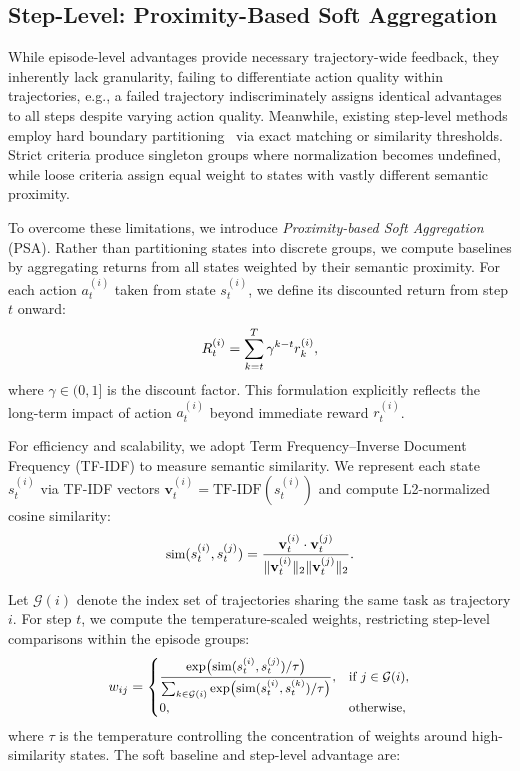 \documentclass[11pt]{article}
\begin{document}
\subsection{Step-Level: Proximity-Based Soft Aggregation}
\label{sec:step_level}

While episode-level advantages provide necessary trajectory-wide feedback, they inherently lack granularity, failing to differentiate action quality within trajectories, e.g., a failed trajectory indiscriminately assigns identical advantages to all steps despite varying action quality. Meanwhile, existing step-level methods employ hard boundary partitioning~\cite{feng2025group} via exact matching or similarity thresholds. Strict criteria produce singleton groups where normalization becomes undefined, while loose criteria assign equal weight to states with vastly different semantic proximity.

To overcome these limitations, we introduce \textit{Proximity-based Soft Aggregation} (PSA). Rather than partitioning states into discrete groups, we compute baselines by aggregating returns from all states weighted by their semantic proximity. For each action $a_t^{(i)}$ taken from state $s_t^{(i)}$, we define its discounted return from step $t$ onward:
\begin{equation}
\small
\label{eq:discounted_return}
R_t^{(i)} = \sum_{k=t}^T \gamma^{k-t} r_k^{(i)},
\end{equation}
where $\gamma \in (0, 1]$ is the discount factor. This formulation explicitly reflects the long-term impact of action $a_t^{(i)}$ beyond immediate reward $r_t^{(i)}$.

For efficiency and scalability, we adopt Term Frequency–Inverse Document Frequency (TF-IDF) to measure semantic similarity. We represent each state $s_t^{(i)}$ via TF-IDF vectors $\mathbf{v}_t^{(i)} = \text{TF-IDF}(s_t^{(i)})$ and compute L2-normalized cosine similarity:
\begin{equation}
\small
\label{eq:similarity}
\text{sim}(s_t^{(i)}, s_t^{(j)}) = \frac{\mathbf{v}_t^{(i)} \cdot \mathbf{v}_t^{(j)}}{\|\mathbf{v}_t^{(i)}\|_2 \|\mathbf{v}_t^{(j)}\|_2}.
\end{equation}

Let $\mathcal{G}(i)$ denote the index set of trajectories sharing the same task as trajectory $i$. For step $t$, we compute the temperature-scaled weights, restricting step-level comparisons within the episode groups:
\begin{equation}
\small
\label{eq:soft_weights}
w_{ij} = \begin{cases}
\displaystyle\frac{\exp\bigl(\text{sim}(s_t^{(i)}, s_t^{(j)}) / \tau\bigr)}{\sum_{k \in \mathcal{G}(i)} \exp\bigl(\text{sim}(s_t^{(i)}, s_t^{(k)}) / \tau\bigr)}, & \text{if } j \in \mathcal{G}(i), \\[6pt]
0, & \text{otherwise},
\end{cases}
\end{equation}
where $\tau$ is the temperature controlling the concentration of weights around high-similarity states. The soft baseline and step-level advantage are:
\end{document}
